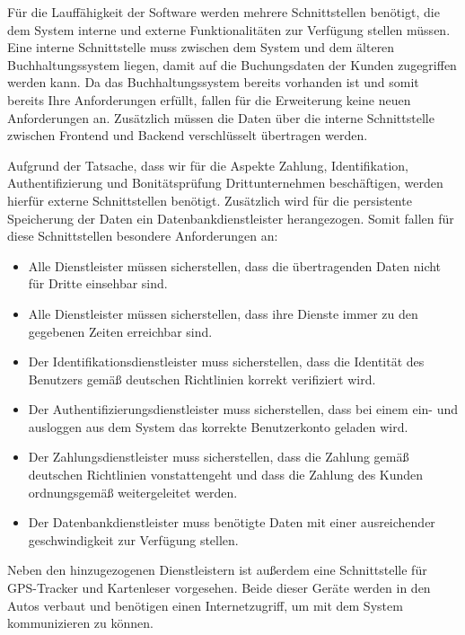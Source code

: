 Für die Lauffähigkeit der Software werden mehrere Schnittstellen benötigt, die dem System interne
und externe Funktionalitäten zur Verfügung stellen müssen.
Eine interne Schnittstelle muss zwischen dem System und dem älteren Buchhaltungssystem liegen, damit auf die
Buchungsdaten der Kunden zugegriffen werden kann.
Da das Buchhaltungssystem bereits vorhanden ist und somit bereits Ihre Anforderungen erfüllt, fallen für die
Erweiterung keine neuen Anforderungen an.
Zusätzlich müssen die Daten über die interne Schnittstelle zwischen Frontend und Backend verschlüsselt übertragen werden. \medskip

Aufgrund der Tatsache, dass wir für die Aspekte Zahlung, Identifikation, Authentifizierung und Bonitätsprüfung Drittunternehmen
beschäftigen, werden hierfür externe Schnittstellen benötigt.
Zusätzlich wird für die persistente Speicherung der Daten ein Datenbankdienstleister herangezogen.
Somit fallen für diese Schnittstellen besondere Anforderungen an:
\begin{itemize}
    \item Alle Dienstleister müssen sicherstellen, dass die übertragenden Daten nicht für Dritte einsehbar sind.
    \item Alle Dienstleister müssen sicherstellen, dass ihre Dienste immer zu den gegebenen Zeiten erreichbar sind.
    \item Der Identifikationsdienstleister muss sicherstellen,
    dass die Identität des Benutzers gemäß deutschen Richtlinien korrekt verifiziert wird.
    \item Der Authentifizierungsdienstleister muss sicherstellen, dass bei einem ein- und ausloggen aus dem System das
    korrekte Benutzerkonto geladen wird.
    \item Der Zahlungsdienstleister muss sicherstellen, dass die Zahlung gemäß deutschen Richtlinien vonstattengeht und
    dass die Zahlung des Kunden ordnungsgemäß weitergeleitet werden.
    \item Der Datenbankdienstleister muss benötigte Daten mit einer ausreichender geschwindigkeit zur Verfügung stellen.
\end{itemize} \medskip

Neben den hinzugezogenen Dienstleistern ist außerdem eine Schnittstelle für GPS-Tracker und Kartenleser vorgesehen.
Beide dieser Geräte werden in den Autos verbaut und benötigen einen Internetzugriff, um mit dem System kommunizieren
zu können.